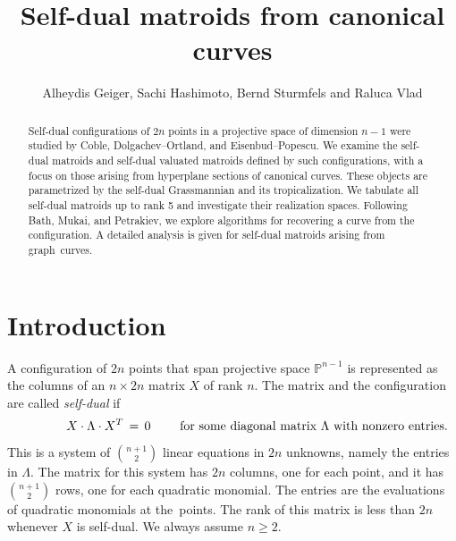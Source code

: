 \documentclass[12pt]{extarticle}
\title{\bf Self-dual matroids from canonical curves}
\author{Alheydis Geiger, Sachi Hashimoto,
    Bernd Sturmfels and Raluca Vlad}
\date{}
\theoremstyle{definition}
\numberwithin{theorem}{section}
\theoremstyle{plain}\newtheorem{ithm}{Theorem}
\newcommand{\PP}{\mathbb{P}}
\begin{document}
\maketitle

\begin{abstract} \noindent
Self-dual configurations of $2n$ points in
a projective space of dimension $n-1$
were studied by
Coble, Dolgachev--Ortland, and
Eisenbud--Popescu.
We examine the self-dual matroids and
self-dual valuated matroids defined by
such configurations, with a focus on those arising from
hyperplane sections of canonical curves. 
These objects are
parametrized by the self-dual Grassmannian and its tropicalization.
We tabulate all self-dual matroids up to rank 5 and investigate their realization spaces.
Following Bath, Mukai, and  Petrakiev, we explore algorithms for recovering a curve from the configuration.
A detailed analysis is given for self-dual
 matroids arising from graph~curves.
\end{abstract}

\section{Introduction}

A configuration of $2n$ points that span projective space $\PP^{n-1}$
is represented as the columns of
an $n \times 2n$ matrix $X$ of rank $n$.
The matrix and the configuration are called  {\em self-dual} if
\begin{equation}
 \label{eq:XDX}
  \qquad \qquad X \cdot \Lambda \cdot X^T \, = \, 0 \qquad \hbox{ for some diagonal matrix $\Lambda$ with nonzero entries.}
  \end{equation}
  This is a system of $\binom{n+1}{2}$ linear equations in $2n$ unknowns, namely the entries in $\Lambda$.
 The matrix for this system has $2n$ columns, one for each point, and  it has
   $\binom{n+1}{2}$ rows, one for each quadratic monomial.
The entries are the evaluations of quadratic monomials at the~points.
The rank of 
 this matrix is less than $2n$ whenever
 $X$ is self-dual.
  We always assume $n \geq 2$.
\end{document}

